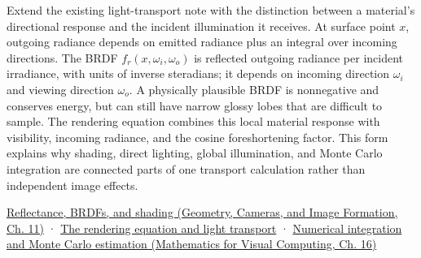 Extend the existing light-transport note with the distinction between a material's directional response and the incident illumination it receives. At surface point \(x\), outgoing radiance depends on emitted radiance plus an integral over incoming directions. The BRDF \(f_r(x,\omega_i,\omega_o)\) is reflected outgoing radiance per incident irradiance, with units of inverse steradians; it depends on incoming direction \(\omega_i\) and viewing direction \(\omega_o\). A physically plausible BRDF is nonnegative and conserves energy, but can still have narrow glossy lobes that are difficult to sample. The rendering equation combines this local material response with visibility, incoming radiance, and the cosine foreshortening factor. This form explains why shading, direct lighting, global illumination, and Monte Carlo integration are connected parts of one transport calculation rather than independent image effects.

\href{../03-Geometry-Cameras-and-Image-Formation/main.pdf\#nameddest=03-visual-computing-i-ch004-reflectance-brdfs-and-shading}{Reflectance, BRDFs, and shading (Geometry, Cameras, and Image Formation, Ch. 11)} · \hyperref[03-visual-computing-i-ch007-the-rendering-equation-and-light-transport]{The rendering equation and light transport} · \href{../02-Mathematics-for-Visual-Computing/main.pdf\#nameddest=03-visual-computing-i-ch012-numerical-integration-and-monte-carlo-estimation}{Numerical integration and Monte Carlo estimation (Mathematics for Visual Computing, Ch. 16)}
